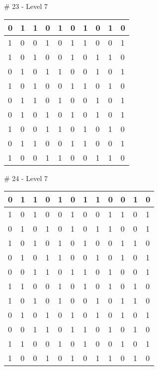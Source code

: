 \smallskip

\# 23 - Level 7 \newline
\begin{tabular}{|m{\collen}|m{\collen}|m{\collen}|m{\collen}|m{\collen}|m{\collen}|m{\collen}|m{\collen}|m{\collen}|m{\collen}|}
\hline
  0 & 1 & 1 & 0 & 1 & 0 & 1 & 0 & 1 & 0 \\
\hline
  1 & 0 & 0 & 1 & 0 & 1 & 1 & 0 & 0 & 1 \\
\hline
  1 & 0 & 1 & 0 & 0 & 1 & 0 & 1 & 1 & 0 \\
\hline
  0 & 1 & 0 & 1 & 1 & 0 & 0 & 1 & 0 & 1 \\
\hline
  1 & 0 & 1 & 0 & 0 & 1 & 1 & 0 & 1 & 0 \\
\hline
  0 & 1 & 1 & 0 & 1 & 0 & 0 & 1 & 0 & 1 \\
\hline
  0 & 1 & 0 & 1 & 0 & 1 & 0 & 1 & 0 & 1 \\
\hline
  1 & 0 & 0 & 1 & 1 & 0 & 1 & 0 & 1 & 0 \\
\hline
  0 & 1 & 1 & 0 & 0 & 1 & 1 & 0 & 0 & 1 \\
\hline
  1 & 0 & 0 & 1 & 1 & 0 & 0 & 1 & 1 & 0 \\
\hline
\end{tabular}


\smallskip

\# 24 - Level 7 \newline
\begin{tabular}{|m{\collen}|m{\collen}|m{\collen}|m{\collen}|m{\collen}|m{\collen}|m{\collen}|m{\collen}|m{\collen}|m{\collen}|m{\collen}|m{\collen}|}
\hline
  0 & 1 & 1 & 0 & 1 & 0 & 1 & 1 & 0 & 0 & 1 & 0 \\
\hline
  1 & 0 & 1 & 0 & 0 & 1 & 0 & 0 & 1 & 1 & 0 & 1 \\
\hline
  0 & 1 & 0 & 1 & 0 & 1 & 0 & 1 & 1 & 0 & 0 & 1 \\
\hline
  1 & 0 & 1 & 0 & 1 & 0 & 1 & 0 & 0 & 1 & 1 & 0 \\
\hline
  0 & 1 & 0 & 1 & 1 & 0 & 0 & 1 & 0 & 1 & 0 & 1 \\
\hline
  0 & 0 & 1 & 1 & 0 & 1 & 1 & 0 & 1 & 0 & 0 & 1 \\
\hline
  1 & 1 & 0 & 0 & 1 & 0 & 1 & 0 & 1 & 0 & 1 & 0 \\
\hline
  1 & 0 & 1 & 0 & 1 & 0 & 0 & 1 & 0 & 1 & 1 & 0 \\
\hline
  0 & 1 & 0 & 1 & 0 & 1 & 0 & 1 & 0 & 1 & 0 & 1 \\
\hline
  0 & 0 & 1 & 1 & 0 & 1 & 1 & 0 & 1 & 0 & 1 & 0 \\
\hline
  1 & 1 & 0 & 0 & 1 & 0 & 1 & 0 & 0 & 1 & 0 & 1 \\
\hline
  1 & 0 & 0 & 1 & 0 & 1 & 0 & 1 & 1 & 0 & 1 & 0 \\
\hline
\end{tabular}


